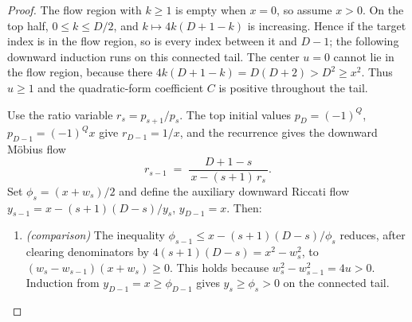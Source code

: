\documentclass[twoside,10pt]{article}
\numberwithin{equation}{section}
\theoremstyle{slbody}
\theoremstyle{definition}
\theoremstyle{remark}
\numberwithin{theorem}{section}
\begin{document}
\begin{proof}
The flow region with $k\ge1$ is empty when $x=0$, so assume $x>0$.
On the top half, $0\le k\le D/2$, and
$k\mapsto4k(D+1-k)$ is increasing.  Hence if the target index is in the
flow region, so is every index between it and $D-1$; the following downward
induction runs on this connected tail.  The center $u=0$ cannot lie in the
flow region, because there $4k(D+1-k)=D(D+2)>D^2\ge x^2$.  Thus $u\ge1$
and the quadratic-form coefficient $C$ is positive throughout the tail.

Use the ratio variable $r_s=p_{s+1}/p_s$.  The top initial values
$p_D=(-1)^Q$, $p_{D-1}=(-1)^Qx$ give $r_{D-1}=1/x$, and the recurrence
gives the downward M\"obius flow
\[
  r_{s-1} \;=\; \frac{D+1-s}{\,x-(s+1)\,r_s\,} .
\]
Set $\phi_s=(x+w_s)/2$ and define the auxiliary downward Riccati flow
$y_{s-1}=x-(s+1)(D-s)/y_s$, $y_{D-1}=x$.  Then:
\begin{enumerate}
\item \emph{(comparison)}  The inequality
  $\phi_{s-1}\le x-(s+1)(D-s)/\phi_s$ reduces, after clearing denominators
  by $4(s+1)(D-s)=x^2-w_s^2$, to
  $(w_s-w_{s-1})(x+w_s)\ge 0$.  This holds because
  $w_s^2-w_{s-1}^2=4u>0$.  Induction from
  $y_{D-1}=x\ge\phi_{D-1}$ gives $y_s\ge\phi_s>0$ on the connected tail.


\end{enumerate}
\end{proof}
\end{document}
